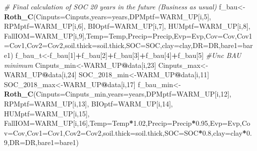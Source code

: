 \documentclass[
  10pt,
  b5paper,
]{book}
\newenvironment{Shaded}{\begin{snugshade}}{\end{snugshade}}
\newcommand{\CommentTok}[1]{\textcolor[rgb]{0.56,0.35,0.01}{\textit{#1}}}
\newcommand{\DataTypeTok}[1]{\textcolor[rgb]{0.13,0.29,0.53}{#1}}
\newcommand{\DecValTok}[1]{\textcolor[rgb]{0.00,0.00,0.81}{#1}}
\newcommand{\FloatTok}[1]{\textcolor[rgb]{0.00,0.00,0.81}{#1}}
\newcommand{\KeywordTok}[1]{\textcolor[rgb]{0.13,0.29,0.53}{\textbf{#1}}}
\newcommand{\NormalTok}[1]{#1}
\newcommand{\OperatorTok}[1]{\textcolor[rgb]{0.81,0.36,0.00}{\textbf{#1}}}
\begin{document}
\begin{Shaded}
\begin{Highlighting}[]
\CommentTok{# Final calculation of SOC  20 years in the future  (Business as usual)}
\NormalTok{f_bau<-}\KeywordTok{Roth_C}\NormalTok{(}\DataTypeTok{Cinputs=}\NormalTok{Cinputs,}\DataTypeTok{years=}\NormalTok{years,}\DataTypeTok{DPMptf=}\NormalTok{WARM_UP[i,}\DecValTok{5}\NormalTok{], }\DataTypeTok{RPMptf=}\NormalTok{WARM_UP[i,}\DecValTok{6}\NormalTok{], }\DataTypeTok{BIOptf=}\NormalTok{WARM_UP[i,}\DecValTok{7}\NormalTok{], }\DataTypeTok{HUMptf=}\NormalTok{WARM_UP[i,}\DecValTok{8}\NormalTok{], }\DataTypeTok{FallIOM=}\NormalTok{WARM_UP[i,}\DecValTok{9}\NormalTok{],}\DataTypeTok{Temp=}\NormalTok{Temp,}\DataTypeTok{Precip=}\NormalTok{Precip,}\DataTypeTok{Evp=}\NormalTok{Evp,}\DataTypeTok{Cov=}\NormalTok{Cov,}\DataTypeTok{Cov1=}\NormalTok{Cov1,}\DataTypeTok{Cov2=}\NormalTok{Cov2,}\DataTypeTok{soil.thick=}\NormalTok{soil.thick,}\DataTypeTok{SOC=}\NormalTok{SOC,}\DataTypeTok{clay=}\NormalTok{clay,}\DataTypeTok{DR=}\NormalTok{DR,}\DataTypeTok{bare1=}\NormalTok{bare1)}
\NormalTok{f_bau_t<-f_bau[}\DecValTok{1}\NormalTok{]}\OperatorTok{+}\NormalTok{f_bau[}\DecValTok{2}\NormalTok{]}\OperatorTok{+}\NormalTok{f_bau[}\DecValTok{3}\NormalTok{]}\OperatorTok{+}\NormalTok{f_bau[}\DecValTok{4}\NormalTok{]}\OperatorTok{+}\NormalTok{f_bau[}\DecValTok{5}\NormalTok{]}
\CommentTok{#Unc BAU minimum }
\NormalTok{Cinputs_min<-WARM_UP}\OperatorTok{@}\NormalTok{data[i,}\DecValTok{23}\NormalTok{]}
\NormalTok{Cinputs_max<-WARM_UP}\OperatorTok{@}\NormalTok{data[i,}\DecValTok{24}\NormalTok{]}
\NormalTok{SOC_}\DecValTok{2018}\NormalTok{_min<-WARM_UP}\OperatorTok{@}\NormalTok{data[i,}\DecValTok{11}\NormalTok{]}
\NormalTok{SOC_}\DecValTok{2018}\NormalTok{_max<-WARM_UP}\OperatorTok{@}\NormalTok{data[i,}\DecValTok{17}\NormalTok{]}
\NormalTok{f_bau_min<-}\KeywordTok{Roth_C}\NormalTok{(}\DataTypeTok{Cinputs=}\NormalTok{Cinputs_min,}\DataTypeTok{years=}\NormalTok{years,}\DataTypeTok{DPMptf=}\NormalTok{WARM_UP[i,}\DecValTok{12}\NormalTok{], }\DataTypeTok{RPMptf=}\NormalTok{WARM_UP[i,}\DecValTok{13}\NormalTok{], }\DataTypeTok{BIOptf=}\NormalTok{WARM_UP[i,}\DecValTok{14}\NormalTok{], }\DataTypeTok{HUMptf=}\NormalTok{WARM_UP[i,}\DecValTok{15}\NormalTok{], }\DataTypeTok{FallIOM=}\NormalTok{WARM_UP[i,}\DecValTok{16}\NormalTok{],}\DataTypeTok{Temp=}\NormalTok{Temp}\OperatorTok{*}\FloatTok{1.02}\NormalTok{,}\DataTypeTok{Precip=}\NormalTok{Precip}\OperatorTok{*}\FloatTok{0.95}\NormalTok{,}\DataTypeTok{Evp=}\NormalTok{Evp,}\DataTypeTok{Cov=}\NormalTok{Cov,}\DataTypeTok{Cov1=}\NormalTok{Cov1,}\DataTypeTok{Cov2=}\NormalTok{Cov2,}\DataTypeTok{soil.thick=}\NormalTok{soil.thick,}\DataTypeTok{SOC=}\NormalTok{SOC}\OperatorTok{*}\FloatTok{0.8}\NormalTok{,}\DataTypeTok{clay=}\NormalTok{clay}\OperatorTok{*}\FloatTok{0.9}\NormalTok{,}\DataTypeTok{DR=}\NormalTok{DR,}\DataTypeTok{bare1=}\NormalTok{bare1)}

\end{Highlighting}
\end{Shaded}
\end{document}

